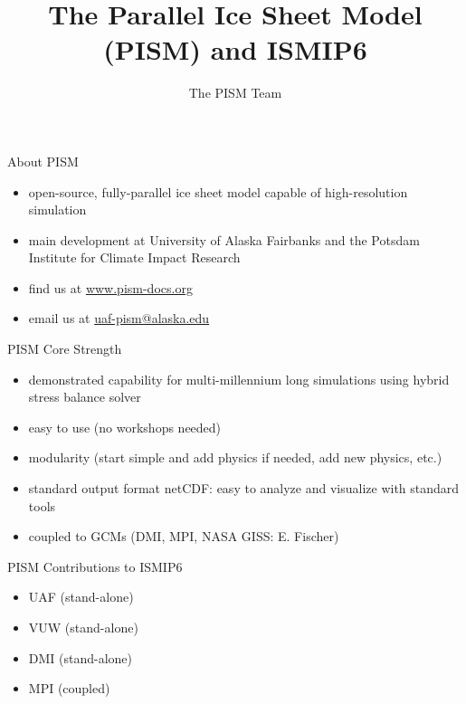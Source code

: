\documentclass[hide notes,intlimits]{beamer}
\title[] %
{The Parallel Ice Sheet Model (PISM) and ISMIP6}
\author[Aschwanden] %
{The PISM Team}
\institute[Geophysical Institute] %
{}
\date{}
\begin{document}




\begin{frame}
  \titlepage
\end{frame}



\begin{frame}{About PISM}
\begin{itemize}
\item open-source, fully-parallel ice sheet model capable of high-resolution simulation
\item main development at University of Alaska Fairbanks and the Potsdam Institute for Climate Impact Research
\item find us at \url{www.pism-docs.org}
\item email us at \url{uaf-pism@alaska.edu}
\end{itemize}
\end{frame}


\begin{frame}{PISM Core Strength}
  \begin{itemize}
  \item demonstrated capability for multi-millennium long simulations using hybrid stress balance solver
  \item easy to use (no workshops needed)
  \item modularity (start simple and add physics if needed, add new physics, etc.)
  \item standard output format netCDF: easy to analyze and visualize with standard tools
  \item coupled to GCMs (DMI, MPI, NASA GISS: E. Fischer)
  \end{itemize}
\end{frame}


\begin{frame}{PISM Contributions to ISMIP6}
    \begin{itemize}
    \item UAF (stand-alone)
    \item VUW (stand-alone)
    \item DMI (stand-alone)
    \item MPI (coupled)
    \end{itemize}
\end{frame}
\end{document}
